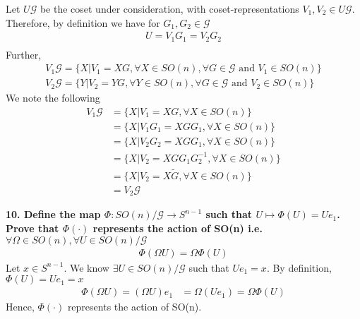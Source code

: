 \documentclass[11pt]{article}
\begin{document}
Let $U\mathcal{G}$ be the coset under consideration, with coset-representations $V_1, V_2 \in U\mathcal{G}$. Therefore, by definition we have for $G_1, G_2 \in \mathcal{G}$
\begin{align*}
U = V_1 G_1 = V_2 G_2\\
\end{align*}
Further, 
\begin{align*}
V_1\mathcal{G} = \{ X | V_1 = X G, \forall X \in SO(n), \forall G \in \mathcal{G} \text{ and } V_1 \in SO(n)\}\\
V_2\mathcal{G} = \{ Y | V_2 = Y G, \forall Y \in SO(n), \forall G \in \mathcal{G} \text{ and } V_2 \in SO(n)\}
\end{align*}
 We note the following
 \begin{align*}
 V_1\mathcal{G} &= \{ X | V_1 = X G, \forall X \in SO(n)\}\\ 
 &= \{ X | V_1G_1 = XGG_1, \forall X \in SO(n)\}\\ 
    &= \{ X | V_2G_2 = XGG_1, \forall X \in SO(n)\}\\ 
        &= \{ X | V_2 = XGG_1G_2^{-1}, \forall X \in SO(n)\}\\
                &= \{ X | V_2 = X\tilde{G}, \forall X \in SO(n)\}\\
                &= V_2\mathcal{G}
 \end{align*}


\hrulefill

\textbf{10. Define the map $\Phi:SO(n)/\mathcal{G} \rightarrow S^{n-1}$ such that $U \mapsto \Phi(U) = Ue_1$. Prove that $\Phi(\cdot)$ represents the action of SO(n) i.e. $\forall \Omega \in SO(n), \forall U \in SO(n)/\mathcal{G}$ 
\begin{align*}
\Phi(\Omega U )= \Omega \Phi(U)
\end{align*}
}
Let $x \in S^{n-1}$. We know $\exists U \in SO(n)/\mathcal{G}$ such that $Ue_1 = x$. By definition, $\Phi(U) = Ue_1 = x$
\begin{align*}
\Phi(\Omega U) = (\Omega U) e_1 &= \Omega(U e_1)= \Omega \Phi(U)
\end{align*}
Hence, $\Phi(\cdot)$ represents the action of SO(n).


\hrulefill
\end{document}
